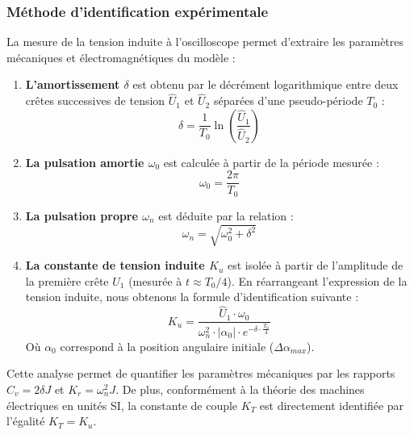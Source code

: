 \subsubsection{Méthode d'identification expérimentale}

La mesure de la tension induite à l'oscilloscope permet d'extraire les paramètres mécaniques et électromagnétiques du modèle :

\begin{enumerate}
    \item \textbf{L'amortissement $\delta$} est obtenu par le décrément logarithmique entre deux crêtes successives de tension $\hat{U}_1$ et $\hat{U}_2$ séparées d'une pseudo-période $T_0$ :
    \begin{equation}
    \delta = \frac{1}{T_0} \ln\left( \frac{\hat{U}_1}{\hat{U}_2} \right)
    \label{eq:calc_delta}
    \end{equation}

    \item \textbf{La pulsation amortie $\omega_0$} est calculée à partir de la période mesurée : 
    \begin{equation}
    \omega_0 = \frac{2\pi}{T_0}
    \label{eq:calc_omega0}
    \end{equation}

    \item \textbf{La pulsation propre $\omega_n$} est déduite par la relation : 
    \begin{equation}
    \omega_n = \sqrt{\omega_0^2 + \delta^2}
    \label{eq:calc_omegan}
    \end{equation}

    \item \textbf{La constante de tension induite $K_u$} est isolée à partir de l'amplitude de la première crête $\hat{U}_1$ (mesurée à $t \approx T_0/4$). En réarrangeant l'expression de la tension induite, nous obtenons la formule d'identification suivante :
    \begin{equation}
    K_u = \frac{\hat{U}_1 \cdot \omega_0}{\omega_n^2 \cdot |\alpha_0| \cdot e^{-\delta \cdot \frac{T_0}{4}}}
    \label{eq:calc_ku}
    \end{equation}
    Où $\alpha_0$ correspond à la position angulaire initiale ($\Delta\alpha_{max}$).
\end{enumerate}

Cette analyse permet de quantifier les paramètres mécaniques par les rapports $C_v = 2\delta J$ et $K_r = \omega_n^2 J$. De plus, conformément à la théorie des machines électriques en unités SI, la constante de couple $K_T$ est directement identifiée par l'égalité $K_T = K_u$.

